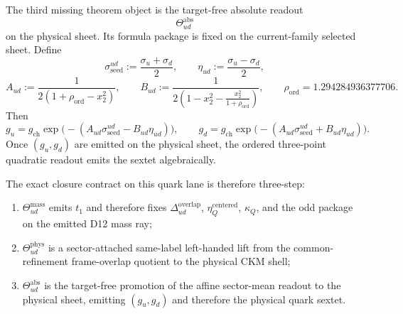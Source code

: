 \documentclass[11pt]{article}
\begin{document}
The third missing theorem object is the target-free absolute readout
\[
\Theta_{ud}^{\mathrm{abs}}
\]
on the physical sheet. Its formula package is fixed on the current-family selected sheet. Define
\[
\sigma_{\mathrm{seed}}^{ud}:=\frac{\sigma_u+\sigma_d}{2},
\qquad
\eta_{ud}:=\frac{\sigma_u-\sigma_d}{2},
\]
\[
A_{ud}:=\frac{1}{2(1+\rho_{\mathrm{ord}}-x_2^2)},
\qquad
B_{ud}:=\frac{1}{2\!\left(1-x_2^2-\frac{x_2^2}{1+\rho_{\mathrm{ord}}}\right)},
\qquad
\rho_{\mathrm{ord}}=1.294284936377706.
\]
Then
\[
g_u
=
g_{\mathrm{ch}}
\exp\!\bigl(-(A_{ud}\sigma_{\mathrm{seed}}^{ud}-B_{ud}\eta_{ud})\bigr),
\qquad
g_d
=
g_{\mathrm{ch}}
\exp\!\bigl(-(A_{ud}\sigma_{\mathrm{seed}}^{ud}+B_{ud}\eta_{ud})\bigr).
\]
Once \((g_u,g_d)\) are emitted on the physical sheet, the ordered three-point quadratic readout emits the sextet algebraically.

The exact closure contract on this quark lane is therefore three-step:
\begin{enumerate}[leftmargin=2em]
\item \(\Theta_{ud}^{\mathrm{mass}}\) emits \(t_1\) and therefore fixes \(\Delta_{ud}^{\mathrm{overlap}}\), \(\eta_Q^{\mathrm{centered}}\), \(\kappa_Q\), and the odd package on the emitted D12 mass ray;
\item \(\Theta_{ud}^{\mathrm{phys}}\) is a sector-attached same-label left-handed lift from the common-refinement frame-overlap quotient to the physical CKM shell;
\item \(\Theta_{ud}^{\mathrm{abs}}\) is the target-free promotion of the affine sector-mean readout to the physical sheet, emitting \((g_u,g_d)\) and therefore the physical quark sextet.
\end{enumerate}
\end{document}
